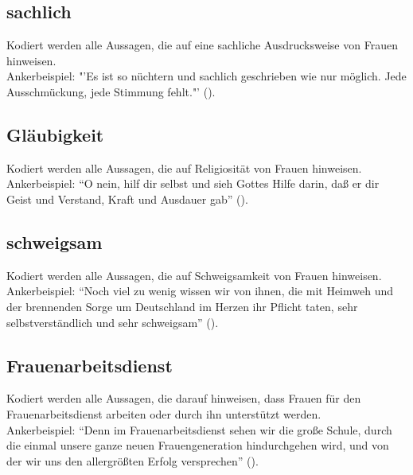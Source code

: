 \documentclass[12pt, titlepage=true, toc=bib]{scrartcl}
\begin{document}
\subsection*{sachlich}

Kodiert werden alle Aussagen, die auf eine sachliche Ausdrucksweise von Frauen hinweisen.\\
Ankerbeispiel: "'Es ist so nüchtern und sachlich geschrieben wie nur möglich. Jede Ausschmückung, jede Stimmung fehlt."' (\cite[669]{maltzahn_deutsche_1936}).

\subsection*{Gläubigkeit}
Kodiert werden alle Aussagen, die auf Religiosität von Frauen hinweisen. \\
Ankerbeispiel: "`O nein, hilf dir selbst und sieh Gottes Hilfe darin, daß er dir Geist und Verstand, Kraft und Ausdauer gab"' (\cite[669]{maltzahn_deutsche_1936}).

\subsection*{schweigsam}

Kodiert werden alle Aussagen, die auf Schweigsamkeit von Frauen hinweisen.\\
Ankerbeispiel: "`Noch viel zu wenig wissen wir von ihnen, die mit Heimweh und der brennenden Sorge um Deutschland im Herzen ihr Pflicht taten, sehr selbstverständlich und sehr schweigsam"' (\cite[669]{maltzahn_deutsche_1936}).

\subsection*{Frauenarbeitsdienst}

Kodiert werden alle Aussagen, die darauf hinweisen, dass Frauen für den Frauenarbeitsdienst arbeiten oder durch ihn unterstützt werden.\\
Ankerbeispiel: "`Denn im Frauenarbeitsdienst sehen wir die große Schule, durch die einmal unsere ganze neuen Frauengeneration hindurchgehen wird, und von der wir uns den allergrößten Erfolg versprechen"' (\cite[775]{a._v._s._kameradschaft_1936}).
\end{document}
